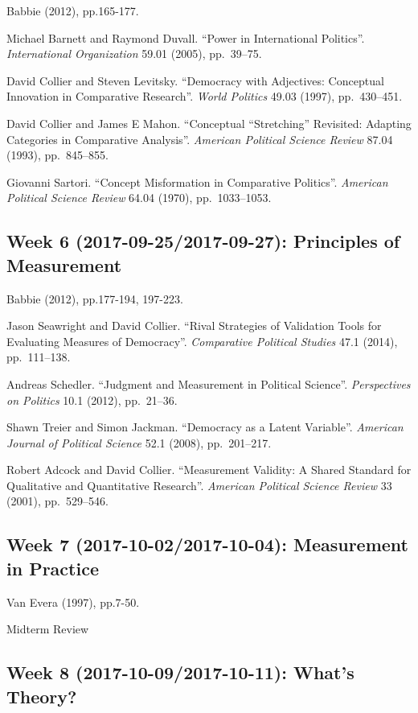 \documentclass[11pt,]{article}
\theoremstyle{definition}
\theoremstyle{definition}
\theoremstyle{remark}
\begin{document}
Babbie (2012), pp.165-177.

Michael Barnett and Raymond Duvall. ``Power in International Politics''.
\emph{International Organization} 59.01 (2005), pp.~39--75.

David Collier and Steven Levitsky. ``Democracy with Adjectives:
Conceptual Innovation in Comparative Research''. \emph{World Politics}
49.03 (1997), pp.~430--451.

David Collier and James E Mahon. ``Conceptual ``Stretching'' Revisited:
Adapting Categories in Comparative Analysis''.
\emph{American Political Science Review} 87.04 (1993), pp.~845--855.

Giovanni Sartori. ``Concept Misformation in Comparative Politics''.
\emph{American Political Science Review} 64.04 (1970), pp.~1033--1053.

\subsection{Week 6 (2017-09-25/2017-09-27): Principles of
Measurement}\label{week-6-2017-09-252017-09-27-principles-of-measurement}

Babbie (2012), pp.177-194, 197-223.

Jason Seawright and David Collier. ``Rival Strategies of Validation
Tools for Evaluating Measures of Democracy''.
\emph{Comparative Political Studies} 47.1 (2014), pp.~111--138.

Andreas Schedler. ``Judgment and Measurement in Political Science''.
\emph{Perspectives on Politics} 10.1 (2012), pp.~21--36.

Shawn Treier and Simon Jackman. ``Democracy as a Latent Variable''.
\emph{American Journal of Political Science} 52.1 (2008), pp.~201--217.

Robert Adcock and David Collier. ``Measurement Validity: A Shared
Standard for Qualitative and Quantitative Research''.
\emph{American Political Science Review} 33 (2001), pp.~529--546.

\subsection{Week 7 (2017-10-02/2017-10-04): Measurement in
Practice}\label{week-7-2017-10-022017-10-04-measurement-in-practice}

Van Evera (1997), pp.7-50.

Midterm Review

\subsection{Week 8 (2017-10-09/2017-10-11): What's
Theory?}\label{week-8-2017-10-092017-10-11-whats-theory}
\end{document}
